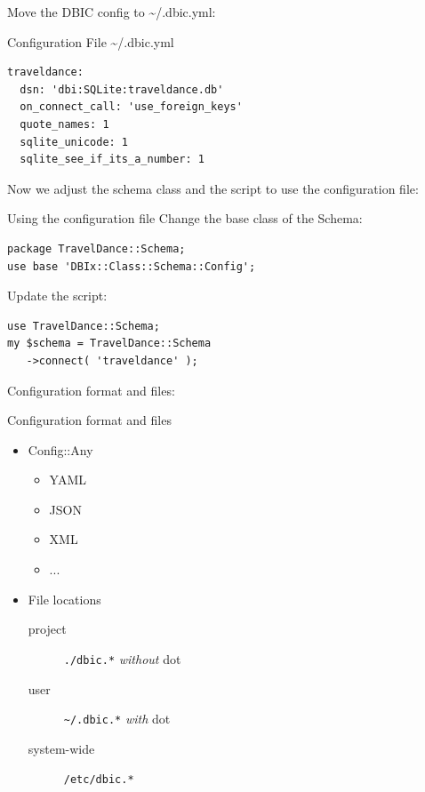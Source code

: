 Move the DBIC config to \textasciitilde/.dbic.yml:

\begin{frame}[fragile]{Configuration File \textasciitilde/.dbic.yml}
\begin{lstlisting}
traveldance:
  dsn: 'dbi:SQLite:traveldance.db'
  on_connect_call: 'use_foreign_keys'
  quote_names: 1
  sqlite_unicode: 1
  sqlite_see_if_its_a_number: 1
\end{lstlisting}
\end{frame}

Now we adjust the schema class and the script to use
the configuration file:

\begin{frame}[fragile]{Using the configuration file}
Change the base class of the Schema:

\begin{lstlisting}
package TravelDance::Schema;
use base 'DBIx::Class::Schema::Config';
\end{lstlisting}

Update the script:

\begin{lstlisting}
use TravelDance::Schema;
my $schema = TravelDance::Schema
   ->connect( 'traveldance' );
\end{lstlisting}
\end{frame}

Configuration format and files:

\begin{frame}[fragile]{Configuration format and files}
\begin{itemize}
\item Config::Any
\begin{itemize}
\item YAML
\item JSON
\item XML
\item ...
\end{itemize}
\item File locations
\begin{description}
\item[project] \verb|./dbic.*| \emph{without} dot
\item[user] \verb|~/.dbic.*| \emph{with} dot
\item[system-wide] \verb|/etc/dbic.*|
\end{description}
\end{itemize}
\end{frame}


